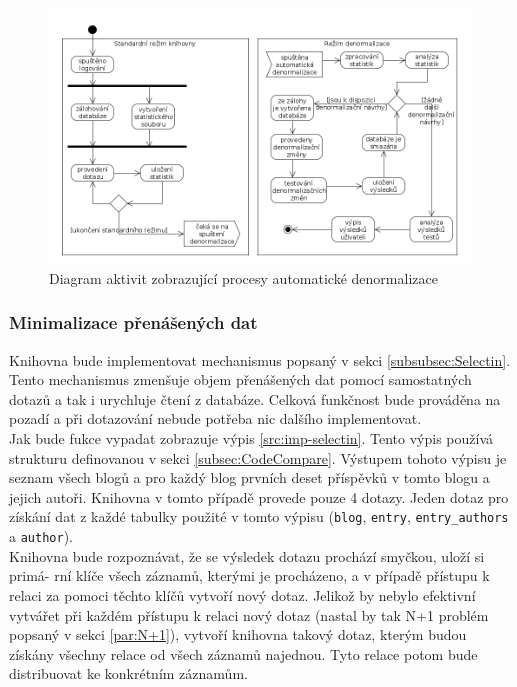 \documentclass[ing,male,java,dept456]{diploma}						%
\begin{document}
\begin{figure}[h!]
    \centering
    \includegraphics[width=150mm]{autodenormalizace.png}
    \caption{Diagram aktivit zobrazující procesy automatické denormalizace}
    \label{fig:Autoden}
\end{figure}

\subsubsection{Minimalizace přenášených dat}

Knihovna bude implementovat mechanismus popsaný v sekci \ref{subsubsec:Selectin}. Tento mechanismus zmenšuje objem přenášených dat pomocí samostatných dotazů a tak i urychluje čtení z databáze. Celková funkčnost bude prováděna na pozadí a při dotazování nebude potřeba nic dalšího implementovat. \\
Jak bude fukce vypadat zobrazuje výpis \ref{src:imp-selectin}. Tento výpis používá strukturu definovanou v sekci \ref{subsec:CodeCompare}. Výstupem tohoto výpisu je seznam všech blogů a pro každý blog prvních deset příspěvků v tomto blogu a jejich autoři. Knihovna v tomto případě provede pouze 4 dotazy. Jeden dotaz pro získání dat z každé tabulky použité v tomto výpisu (\lstinline[style=inlinepython]|blog|, \lstinline[style=inlinepython]|entry|, \lstinline[style=inlinepython]|entry_authors| a \lstinline[style=inlinepython]|author|). \\
Knihovna bude rozpoznávat, že se výsledek dotazu prochází smyčkou, uloží si primá- rní klíče všech záznamů, kterými je procházeno, a v případě přístupu k relaci za pomoci těchto klíčů vytvoří nový dotaz. Jelikož by nebylo efektivní vytvářet při každém přístupu k relaci nový dotaz (nastal by tak N+1 problém popsaný v sekci \ref{par:N+1}), vytvoří knihovna takový dotaz, kterým budou získány všechny relace od všech záznamů najednou. Tyto relace potom bude distribuovat ke konkrétním záznamům. \\
\end{document}

